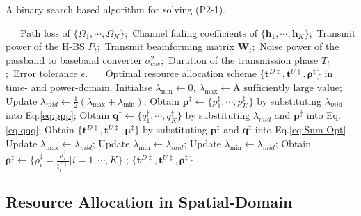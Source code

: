 \documentclass[12pt,draftcls,onecolumn,journal]{IEEEtran}
\begin{document}
\begin{algorithm}[!t]
	\caption{A binary search based algorithm for solving (P2-1).}
	\footnotesize
	\begin{algorithmic}[1]
		\REQUIRE ~~\
		Path loss of $\{\Omega_1,\cdots,\Omega_K\}$;\
		Channel fading coefficients of $\{\mathbf{h}_1,\cdots,\mathbf{h}_K\}$;\
		Transmit power of the H-BS $P_{t}$;\
		Transmit beamforming matrix $\mathbf{W}_t$;\
		Noise power of the passband to baseband converter $\sigma^2_{cov}$;\
		Duration of the transmission phase $T_t$;\
		Error tolerance $\epsilon$.
		\ENSURE ~~\
		Optimal resource allocation scheme $\{\mathbf{t}^{D\ddagger}, \mathbf{t}^{U\ddagger}, \boldsymbol{\rho}^{\ddagger}\}$ in time- and power-domain.
		\STATE Initialise $\lambda_{\min}\leftarrow 0$, $\lambda_{\max}\leftarrow \text{A sufficiently large value}$;
		\WHILE{$\lambda_{\max} - \lambda_{\min} > \epsilon$}
			\STATE Update $\lambda_{mid} \leftarrow \frac{1}{2}(\lambda_{\max} + \lambda_{\min})$;
			\STATE Obtain $\mathbf{p}^{\ddagger} \leftarrow \{p_1^{\ddagger}, \cdots, p_K^{\ddagger}\}$ by substituting $\lambda_{mid}$ into Eq.\eqref{eq:ppp};
				\STATE Obtain $\mathbf{q}^{\ddagger} \leftarrow \{q_1^{\ddagger}, \cdots, q_K^{\ddagger}\}$ by substituting $\lambda_{mid}$ and $\mathbf{p}^{\ddagger}$ into Eq.\eqref{eq:qqq};
				\STATE Obtain $\{\mathbf{t}^{D\ddagger}, \mathbf{t}^{U\ddagger}, \boldsymbol{\mu}^{\ddagger}\}$ by substituting $\mathbf{p}^{\ddagger}$ and $\mathbf{q}^{\ddagger}$ into Eq.\eqref{eq:Sum-Opt}
				\IF{$\sum_{i=1}^Kt_i^{D\ddagger} + t_i^{U\ddagger}\leq T_t$} 
					\STATE Update $\lambda_{\max} \leftarrow \lambda_{mid}$;
				\ELSE 
					\STATE Update $\lambda_{\min} \leftarrow \lambda_{mid}$;
				\ENDIF
			\ELSE
					\STATE Update $\lambda_{\min}\leftarrow\lambda_{mid}$;
			\ENDIF
		\ENDWHILE
		\STATE Obtain $\boldsymbol{\rho}^{\ddagger} \leftarrow \{\rho_i^{\ddagger} = \frac{\mu_i^{\ddagger}}{t_i^{D\ddagger}} | i=1,\cdots, K\}$ ;
		\RETURN $\{\mathbf{t}^{D\ddagger}, \mathbf{t}^{U\ddagger}, \boldsymbol{\rho}^{\ddagger}\}$
	\end{algorithmic}
\end{algorithm}


\subsection{Resource Allocation in Spatial-Domain}
\end{document}
